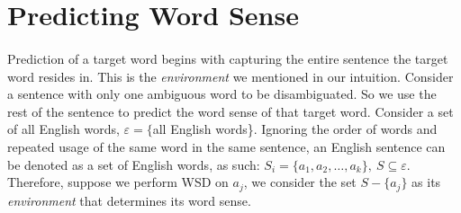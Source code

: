 
\section{Predicting Word Sense}
\paragraph{}
Prediction of a target word begins with capturing the entire sentence the target word resides in. This is the \textit{environment} we mentioned in our intuition. 
Consider a sentence with only one ambiguous word to be disambiguated.%
 So we use the rest of the sentence to predict the word sense of that target word. Consider a set of all English words, $\varepsilon = \{$all English words\}. Ignoring the order of words and repeated usage of the same word in the same sentence, an English sentence can be denoted as a set of English words, as such: $S_{i} = \{a_{1}, a_{2}, \ldots, a_{k}\},~S\subseteq \varepsilon$. Therefore, suppose we perform WSD on $a_{j}$, we consider the set $S - \{a_{j}\}$ as its \textit{environment} that determines its word sense.

